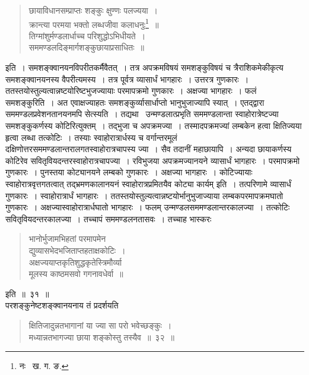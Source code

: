 \documentclass[11pt, openany]{book}
\begin{document}
\newpage

\begin{quote}
{\qt छायाविधानसम्प्राप्तः शङ्कुः क्षुण्णः पलज्यया~। \\
क्रान्त्या परमया भक्तो लब्धजीवा कलाधनुः\renewcommand{\thefootnote}{१}\footnote{नः \textendash\ ख. ग. ङ.}~॥\\
तिग्मांशुर्मण्डलार्धाच्च परिशुद्धोऽभिधीयते~। \\
सममण्डलदिङ्मार्गशङ्कुछायाप्रसाधितः~॥} 
\end{quote} 

\noindent इति~। समशङ्क्वानयनविपरीतकर्मैवैतत्~। तत्र अपक्रमविषयं समशङ्कुविषयं च त्रैराशिकमेकीकृत्य समशङ्क्वानयनस्य वैपरीत्यमस्य~। तत्र पूर्वत्र व्यासार्धं भागहारः~। उत्तरत्र गुणकारः~। ततस्तयोस्तुल्यत्वान्नष्टयोरिष्टभुजज्यायाः परमापक्रमो गुणकारः~। अक्षज्या भागहारः~। फलं समशङ्कुरिति~। अत एवाक्षज्याहतः समशङ्कुर्व्यासार्धाप्तो भानुभुजाज्यापि स्यात्~। एतद्द्वारा सममण्डलप्रवेशनतानयनमपि सेत्स्यति~। तद्यथा \textendash\ उन्मण्डलात्प्रभृति सममण्डलान्ता स्वाहोरात्रेष्टज्या समशङ्कुकर्णस्य कोटिरित्युक्तम्~। तद्भुजा च अपक्रमज्या~। तस्मादपक्रमज्यां लम्बकेन हत्वा क्षितिज्यया हृत्वा लब्धा तत्कोटिः~। तस्याः स्वाहोरात्रार्धस्य च वर्गान्तरमूलं दक्षिणोत्तरसममण्डलान्तरालगतस्वाहोरात्रचापस्य ज्या~। सैव तदानीं महाछायापि~। अन्यदा छायाकर्णस्य 
कोटिरेव सवितृवियदन्तरस्वाहोरात्रचापज्या~। रविभुजया अपक्रमज्यानयने व्यासार्धं भागहारः~। परमापक्रमो गुणकारः~। पुनस्तया 
कोट्यानयने लम्बको गुणकारः~। अक्षज्या भागहारः~। कोटिज्यायाः स्वाहोरात्रवृत्तगतत्वात् तद्भ्रमणकालानयनं स्वाहोरात्रप्रमितयैव कोट्या कार्यम् इति~। तत्परिणामे व्यासार्धं गुणकारः~। स्वाहोरात्रार्धं भागहारः~। ततस्तयोस्तुल्यत्वान्नष्टयोर्भानुभुजाज्याया लम्बकपरमापक्रमघातो गुणकारः~। अक्षज्यास्वाहोरात्रार्धघातो भागहारः~। फलम् उन्मण्डलसममण्डलान्तरकालज्या~। तत्कोटिः सवितृवियदन्तरकालज्या~। तच्चापं सममण्डलनतासवः~। तच्चाह भास्करः\textendash  

\newpage

\begin{quote} 
{\qt भानोर्भुजामभिहतां परमापमेन \\
 द्युव्यासभेदभजिताप्तहताक्षकोटिः~। \\
 अक्षज्ययाप्तकृतिशुद्धकृतेस्त्रिमौर्व्या \\
मूलस्य काष्ठमसवो गगनावधेर्वा~॥} 
\end{quote}
इति~॥~३१~॥ \\

\indent परशङ्कुनेष्टशङ्क्वानयनाय तं प्रदर्शयति\textendash 
\begin{quote}
{\ab क्षितिजादुन्नतभागानां या ज्या सा परो भवेच्छङ्कुः~। \\
 मध्यान्नतभागज्या छाया शङ्कोस्तु तस्यैव~॥~३२~॥} 
\end{quote}
 
\end{document}
